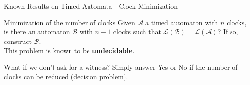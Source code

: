 \begin{frame}{Known Results on Timed Automata - Clock Minimization}

  \begin{alertblock}{Minimization of the number of clocks}
    Given $\mathcal{A}$ a timed automaton with $n$ clocks, is there an automaton $\mathcal{B}$ with $n-1$ clocks such that $\mathcal{L(B)=L(A)}$? If so, construct $\mathcal{B}$.\\
    This problem is known to be \textbf{undecidable}.
  \end{alertblock}
  \vfill
  \begin{exampleblock}{What if we don't ask for a witness?}
    Simply answer Yes or No if the number of clocks can be reduced (decision problem).
  \end{exampleblock}
    
\end{frame}

